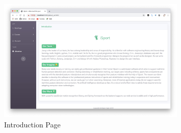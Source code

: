 \documentclass[16pt]{scrreprt}
\begin{document}
\begin{figure}[H]
    \centering
    \includegraphics[width=0.8\textwidth]{diagrams/about-us.jpg}
    \caption{Introduction Page}
\end{figure}
\end{document}
